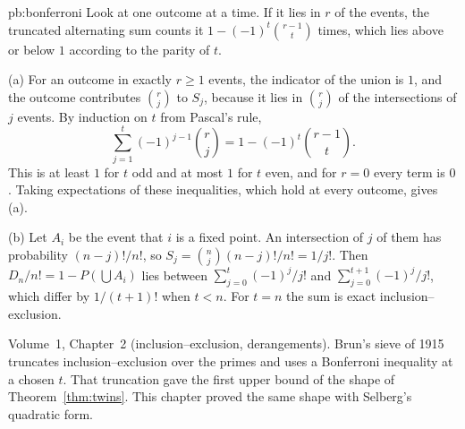 \begin{solution}{pb:bonferroni}
\idea Look at one outcome at a time. If it lies in $r$ of the events, the truncated alternating sum counts it $1-(-1)^t\binom{r-1}t$ times, which lies above or below $1$ according to the parity of $t$.

\writeup (a) For an outcome in exactly $r\ge1$ events, the indicator of the union is $1$, and the outcome contributes $\binom rj$ to $S_j$, because it lies in $\binom rj$ of the intersections of $j$ events. By induction on $t$ from Pascal's rule,
\[
\sum_{j=1}^t(-1)^{j-1}\binom rj=1-(-1)^t\binom{r-1}t.
\]
This is at least $1$ for $t$ odd and at most $1$ for $t$ even, and for $r=0$ every term is $0$. Taking expectations of these inequalities, which hold at every outcome, gives (a).

(b) Let $A_i$ be the event that $i$ is a fixed point. An intersection of $j$ of them has probability $(n-j)!/n!$, so $S_j=\binom nj(n-j)!/n!=1/j!$. Then $D_n/n!=1-P(\bigcup A_i)$ lies between $\sum_{j=0}^t(-1)^j/j!$ and $\sum_{j=0}^{t+1}(-1)^j/j!$, which differ by $1/(t+1)!$ when $t<n$. For $t=n$ the sum is exact inclusion--exclusion.

\tools Volume~1, Chapter~2 (inclusion--exclusion, derangements).
\leads Brun's sieve of 1915 truncates inclusion--exclusion over the primes and uses a Bonferroni inequality at a chosen $t$. That truncation gave the first upper bound of the shape of Theorem~\ref{thm:twins}. This chapter proved the same shape with Selberg's quadratic form.
\end{solution}

